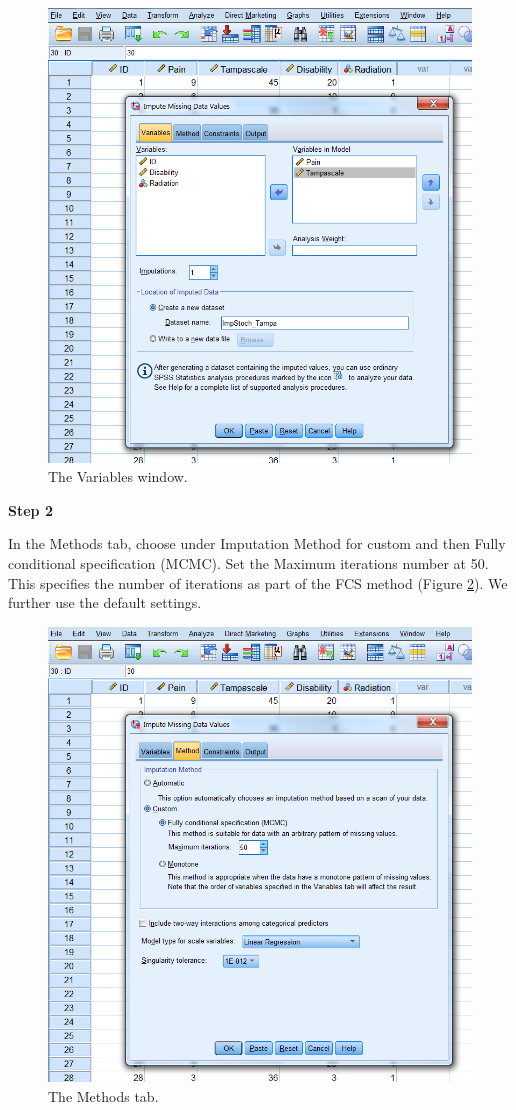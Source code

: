 \documentclass[]{book}
\begin{document}
\begin{figure}

{\centering \includegraphics[width=0.7\linewidth]{images/fig3.18} 

}

\caption{The Variables window.}\label{fig:fig3-18}
\end{figure}

\textbf{Step 2}

In the Methods tab, choose under Imputation Method for custom and then
Fully conditional specification (MCMC). Set the Maximum iterations
number at 50. This specifies the number of iterations as part of the FCS
method (Figure \ref{fig:fig3-19}). We further use the default settings.

\begin{figure}

{\centering \includegraphics[width=0.7\linewidth]{images/fig3.19} 

}

\caption{The Methods tab.}\label{fig:fig3-19}
\end{figure}
\end{document}
